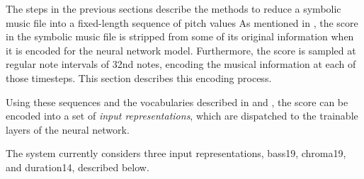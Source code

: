 
The steps in the previous sections describe the methods to
reduce a symbolic music file into a fixed-length sequence of
pitch values As mentioned in ,
the score in the symbolic music file is stripped from some
of its original information when it is encoded for the
neural network model. Furthermore, the score is sampled at
regular note intervals of \gls{32nd} notes, encoding the
musical information at each of those timesteps. This section
describes this encoding process.

Using these sequences and the vocabularies described in
 and
, the
score can be encoded into a set of \emph{input
representations}, which are dispatched to the trainable
layers of the neural network.

The system currently considers three input representations,
\gls{bass19}, \gls{chroma19}, and \gls{duration14},
described below.


